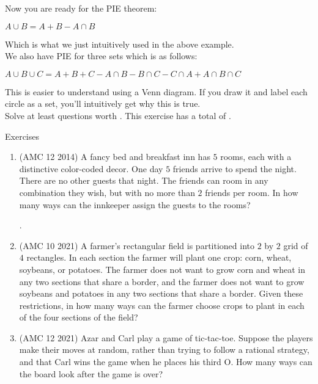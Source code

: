 Now you are ready for the PIE theorem:
\begin{theorem}
    $A \cup B = A + B - A \cap B$
\end{theorem}
Which is what we just intuitively used in the above example.\\
We also have PIE for three sets which is as follows:
\begin{theorem}
    $A \cup B \cup C = A + B + C - A \cap B - B \cap C - C \cap A + A \cap B \cap C$    
\end{theorem}
This is easier to understand using a Venn diagram. If you draw it and label each circle as a set, you'll intuitively get why this is true.\\
Solve at least questions worth . This exercise has a total of .
\begin{xcb}{Exercises}
\begin{enumerate}
\item (AMC 12 2014)  A fancy bed and breakfast inn has $5$ rooms, each with a distinctive color-coded decor. One day $5$ friends arrive to spend the night. There are no other guests that night. The friends can room in any combination they wish, but with no more than $2$ friends per room. In how many ways can the innkeeper assign the guests to the rooms?
\begin{hint}
    .
\end{hint}
\item (AMC 10 2021)  A farmer’s rectangular field is partitioned into $2$ by $2$ grid of $4$ rectangles. In each section the farmer will plant one crop: corn, wheat, soybeans, or potatoes. The farmer does not want to grow corn and wheat in any two sections that share a border, and the farmer does not want to grow soybeans and potatoes in any two sections that share a border. Given these restrictions, in how many ways can the farmer choose crops to plant in each of the four sections of the field?
\item (AMC 12 2021)  Azar and Carl play a game of tic-tac-toe. Suppose the players make their moves at random, rather than trying to follow a rational strategy, and that Carl wins the game when he places his third O. How many ways can the board look after the game is over?
\begin{hint}

\end{hint}
\end{enumerate}
\end{xcb}
